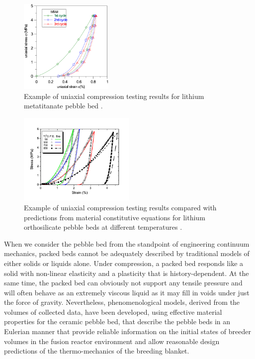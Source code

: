 \begin{figure}[t!]
	\begin{center}
	\includegraphics[width=0.4\textwidth]{chapters/figures/Fig-1}
	\caption{Example of uniaxial compression testing results for lithium metatitanate pebble bed \cite{vanderlaan2011}.}
	\label{fig:mti}
	\end{center}
\end{figure}

\begin{figure}[t!]
	\begin{center}
	\includegraphics[width=0.5\textwidth]{chapters/figures/Fig-2}
	\caption{Example of uniaxial compression testing results compared with predictions from material constitutive equations for lithium orthosilicate pebble beds at different temperatures \cite{Gan:2008kx}.}
	\label{fig:UCT}
	\end{center}
\end{figure}


When we consider the pebble bed from the standpoint of engineering continuum mechanics, packed beds cannot be adequately described by traditional models of either solids or liquids alone. Under compression, a packed bed responds like a solid with non-linear elasticity and a plasticity that is history-dependent. At the same time, the packed bed can obviously not support any tensile pressure and will often behave as an extremely viscous liquid as it may fill in voids under just the force of gravity. Nevertheless, phenomenological models, derived from the volumes of collected data, have been developed, using effective material properties for the ceramic pebble bed, that describe the pebble beds in an Eulerian manner that provide reliable information on the initial states of breeder volumes in the fusion reactor environment and allow reasonable design predictions of the thermo-mechanics of the breeding blanket. 

